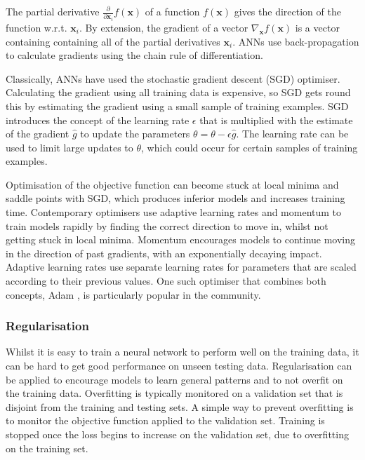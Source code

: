 The partial derivative $\frac{\partial}{\partial \mathbf{x}_i}f(\mathbf{x})$ of a function $f(\mathbf{x})$ gives the direction of the function w.r.t. $\mathbf{x}_i$. By extension, the gradient of a vector $\nabla_\mathbf{x}f(\mathbf{x})$ is a vector containing containing all of the partial derivatives $\mathbf{x}_i$. ANNs use back-propagation to calculate gradients using the chain rule of differentiation.

Classically, ANNs have used the stochastic gradient descent (SGD) optimiser. Calculating the gradient using all training data is expensive, so SGD gets round this by estimating the gradient using a small sample of training examples. SGD introduces the concept of the learning rate $\epsilon$ that is multiplied with the estimate of the gradient $\hat{g}$ to update the parameters $\theta = \theta - \epsilon\hat{g}$. The learning rate can be used to limit large updates to $\theta$, which could occur for certain samples of training examples.

Optimisation of the objective function can become stuck at local minima and saddle points with SGD, which produces inferior models and increases training time. Contemporary optimisers use adaptive learning rates and momentum to train models rapidly by finding the correct direction to move in, whilst not getting stuck in local minima. Momentum encourages models to continue moving in the direction of past gradients, with an exponentially decaying impact. Adaptive learning rates use separate learning rates for parameters that are scaled according to their previous values. One such optimiser that combines both concepts, Adam \cite{Kingma2014}, is particularly popular in the community.

\subsubsection{Regularisation}

Whilst it is easy to train a neural network to perform well on the training data, it can be hard to get good performance on unseen testing data. Regularisation can be applied to encourage models to learn general patterns and to not overfit on the training data. Overfitting is typically monitored on a validation set that is disjoint from the training and testing sets. A simple way to prevent overfitting is to monitor the objective function applied to the validation set. Training is stopped once the loss begins to increase on the validation set, due to overfitting on the training set.

